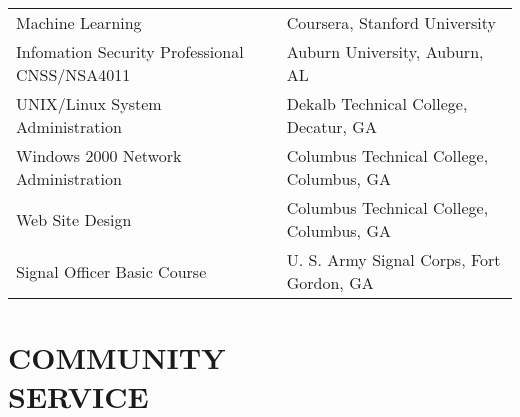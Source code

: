 \documentclass[margin, 10pt]{res} %
\begin{document}
\begin{resume}
\begin{tabular}{l l }
        Machine Learning & Coursera, Stanford University\\

    Infomation Security Professional CNSS/NSA4011 & Auburn University, Auburn, AL\\

        UNIX/Linux System Administration & Dekalb Technical College,  Decatur, GA\\

        Windows 2000 Network Administration & Columbus Technical College, Columbus, GA\\

        Web Site Design & Columbus Technical College, Columbus, GA\\

        Signal Officer Basic Course & U. S. Army Signal Corps,  Fort Gordon, GA\\
    \end{tabular}
    \normalsize
%
%
%
%
%
%



\section{COMMUNITY \\ SERVICE}

\begin{itemize} \itemsep -2pt %


\end{itemize}
\end{resume}
\end{document}

